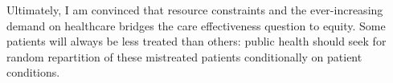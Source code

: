 \documentclass[french,12pt,twoside,a4paper]{book}
\begin{document}
Ultimately, I am convinced that resource constraints and the
ever-increasing demand on healthcare bridges the care effectiveness question to
equity. Some patients will always be less treated than others: public health
should seek for random repartition of these mistreated patients conditionally
on patient conditions.






\end{document}
